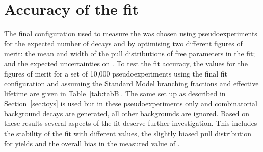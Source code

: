 \section{Accuracy of the fit}
\label{sec:fitaccuracy}
The final configuration used to measure the \el was chosen using pseudoexperiments for the expected number of decays and by optimising two different figures of merit: the mean and width of the pull distributions of free parameters in the fit; and the expected uncertainties on \tmumu. To test the fit accuracy, the values for the figures of merit for a set of 10,000 pseudoexperiments using the final fit configuration and assuming the Standard Model \bmumu branching fractions and effective lifetime are given in Table~\ref{tab:tabB}. The same set up as described in Section~\ref{sec:toys} is used but in these pseudoexperiments only \bsmumu and combinatorial background decays are generated, all other backgrounds are ignored. 
Based on these results several aspects of the fit deserve further investigation. This includes the stability of the fit with different \tmumu values, the slightly biased pull distribution for \bsmumu yields and the overall bias in the measured value of \tmumu. 

